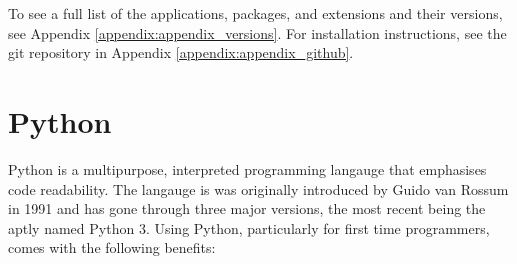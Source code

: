 To see a full list of the applications, packages, and extensions and their versions, see Appendix
\ref{appendix:appendix_versions}. For installation instructions, see the git repository in Appendix
\ref{appendix:appendix_github}.

\section{Python}

Python is a multipurpose, interpreted programming langauge that emphasises code readability. The langauge is
was originally introduced by Guido van Rossum in 1991 and has gone through three major versions,
the most recent being the aptly named Python 3. Using Python, particularly for first time programmers,
comes with the following benefits:

